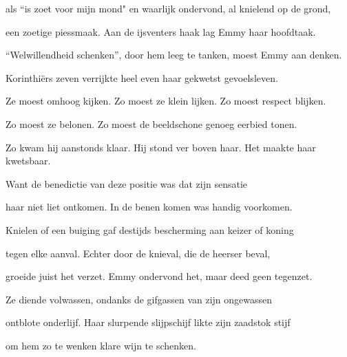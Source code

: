 als “is zoet voor mijn mond"
en waarlijk ondervond,
al knielend op de grond,

een zoetige piessmaak.
Aan de ijsventers haak
lag Emmy haar hoofdtaak.

“Welwillendheid schenken”,
door hem leeg te tanken,
moest Emmy aan denken.

Korinthiërs zeven
verrijkte heel even
haar gekwetst gevoelsleven.

Ze moest omhoog kijken.
Zo moest ze klein lijken.
Zo moest respect blijken.

Zo moest ze belonen.
Zo moest de beeldschone
genoeg eerbied tonen.

Zo kwam hij aanstonds klaar.
Hij stond ver boven haar.
Het maakte haar kwetsbaar.

Want de benedictie
van deze positie
was dat zijn sensatie

haar niet liet ontkomen.
In de benen komen
was handig voorkomen.

Knielen of een buiging
gaf destijds bescherming
aan keizer of koning

tegen elke aanval.
Echter door de knieval,
die de heerser beval,

groeide juist het verzet.
Emmy ondervond het,
maar deed geen tegenzet.

Ze diende volwassen,
ondanks de gifgassen
van zijn ongewassen

ontblote onderlijf.
Haar slurpende slijpschijf
likte zijn zaadstok stijf

om hem zo te wenken
klare wijn te schenken.
